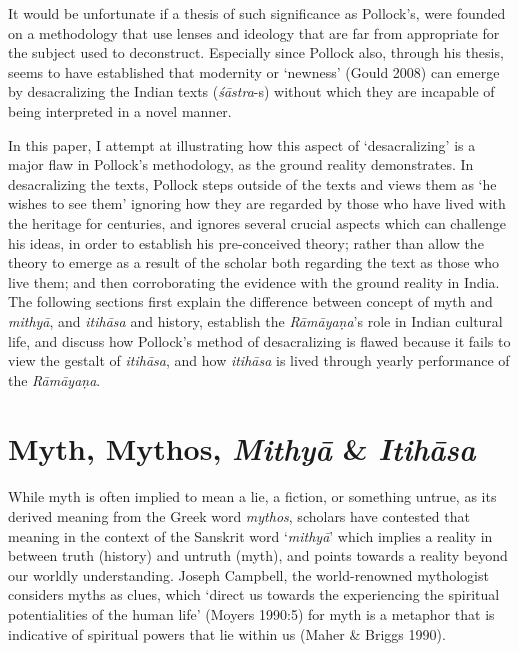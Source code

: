It would be unfortunate if a thesis of such significance as Pollock’s, were founded on a methodology that use lenses and ideology that are far from appropriate for the subject used to deconstruct. Especially since Pollock also, through his thesis, seems to have established that modernity or ‘newness’ (Gould 2008) can emerge by desacralizing the Indian texts (\textit{śāstra}-s) without which they are incapable of being interpreted in a novel manner.

In this paper, I attempt at illustrating how this aspect of ‘desacralizing’ is a major flaw in Pollock’s methodology, as the ground reality demonstrates. In desacralizing the texts, Pollock steps outside of the texts and views them as ‘he wishes to see them’ ignoring how they are regarded by those who have lived with the heritage for centuries, and ignores several crucial aspects which can challenge his ideas, in order to establish his pre-conceived theory; rather than allow the theory to emerge as a result of the scholar both regarding the text as those who live them; and then corroborating the evidence with the ground reality in India. The following sections first explain the difference between concept of myth and \textit{mithyā}, and \textit{itihāsa} and history, establish the \textit{Rāmāyaṇa}’s role in Indian cultural life, and discuss how Pollock’s method of desacralizing is flawed because it fails to view the gestalt of \textit{itihāsa}, and how \textit{itihāsa} is lived through yearly performance of the \textit{Rāmāyaṇa}.


\section*{Myth, Mythos, \textit{Mithyā} \& \textit{Itihāsa}}

While myth is often implied to mean a lie, a fiction, or something untrue, as its derived meaning from the Greek word \textit{mythos}, scholars have contested that meaning in the context of the Sanskrit word ‘\textit{mithyā}’ which implies a reality in between truth (history) and untruth (myth), and points towards a reality beyond our worldly understanding. Joseph Campbell, the world-renowned mythologist considers myths as clues, which ‘direct us towards the experiencing the spiritual potentialities of the human life’ (Moyers 1990:5) for myth is a metaphor that is indicative of spiritual powers that lie within us (Maher \& Briggs 1990).

